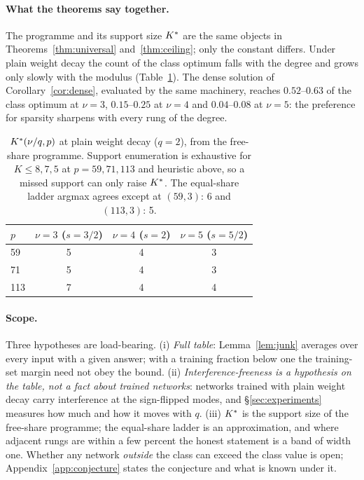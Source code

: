 \paragraph{What the theorems say together.} The programme and its support size $K^{*}$ are the same
objects in Theorems~\ref{thm:universal} and~\ref{thm:ceiling}; only the constant differs. Under plain
weight decay the count of the class optimum falls with the degree and grows only slowly with the
modulus (Table~\ref{tab:kstar}). The dense solution of Corollary~\ref{cor:dense}, evaluated by the same
machinery, reaches $0.52$--$0.63$ of the class optimum at $\nu=3$, $0.15$--$0.25$ at $\nu=4$ and
$0.04$--$0.08$ at $\nu=5$: the preference for sparsity sharpens with every rung of the degree.

\begin{table}[t]
\centering
\caption{$K^{*}(\nu/q,p)$ at plain weight decay ($q=2$), from the free-share programme. Support
enumeration is exhaustive for $K\le 8,7,5$ at $p=59,71,113$ and heuristic above, so a missed support can
only raise $K^{*}$. The equal-share ladder argmax agrees except at $(59,3)$: 6 and $(113,3)$: 5.}
\label{tab:kstar}
\begin{tabular}{lccc}
\toprule
$p$ & $\nu=3$ ($s=3/2$) & $\nu=4$ ($s=2$) & $\nu=5$ ($s=5/2$)\\
\midrule
59  & 5 & 4 & 3\\
71  & 5 & 4 & 3\\
113 & 7 & 4 & 4\\
\bottomrule
\end{tabular}
\end{table}

\paragraph{Scope.} Three hypotheses are load-bearing. (i) \emph{Full table}: Lemma~\ref{lem:junk}
averages over every input with a given answer; with a training fraction below one the training-set
margin need not obey the bound. (ii) \emph{Interference-freeness is a hypothesis on the table, not a
fact about trained networks}: networks trained with plain weight decay carry interference at the
sign-flipped modes, and \S\ref{sec:experiments} measures how much and how it moves with $q$.
(iii) $K^{*}$ is the support size of the free-share programme; the equal-share ladder is an
approximation, and where adjacent rungs are within a few percent the honest statement is a band of width
one. Whether any network \emph{outside} the class can exceed the class value is open; Appendix~\ref{app:conjecture}
states the conjecture and what is known under it.
